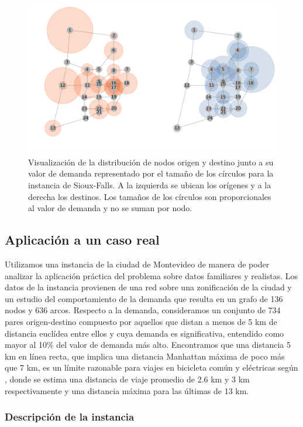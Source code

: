 \documentclass{article}
\begin{document}
  \begin{figure}[h!]
    \centering
    \includegraphics[width=12cm]{../resources/sioux_falls_demand.png}
    \caption{Visualización de la distribución de nodos origen y destino junto a su valor de demanda representado por el tamaño de los círculos para la instancia de Sioux-Falls. A la izquierda se ubican los orígenes y a la derecha los destinos. Los tamaños de los círculos son proporcionales al valor de demanda y no se suman por nodo.}
    \label{fig:sioux_falls_demand}
  \end{figure}

  \FloatBarrier
  \subsection{Aplicación a un caso real}

  Utilizamos una instancia de la ciudad de Montevideo de manera de poder analizar la aplicación práctica del problema sobre datos familiares y realistas. Los datos de la instancia provienen de una red sobre una zonificación de la ciudad y un estudio del comportamiento de la demanda que resulta en un grafo de 136 nodos y 636 arcos. Respecto a la demanda, consideramos un conjunto de 734 pares origen-destino compuesto por aquellos que distan a menos de 5 km de distancia euclídea entre ellos y cuya demanda es significativa, entendido como mayor al 10\% del valor de demanda más alto. Encontramos que una distancia 5 km en línea recta, que implica una distancia Manhattan máxima de poco más que 7 km, es un límite razonable para viajes en bicicleta común y eléctricas según \cite{anette2018}, donde se estima una distancia de viaje promedio de 2.6 km y 3 km respectivamente y una distancia máxima para las últimas de 13 km.

  \subsubsection{Descripción de la instancia}
\end{document}
